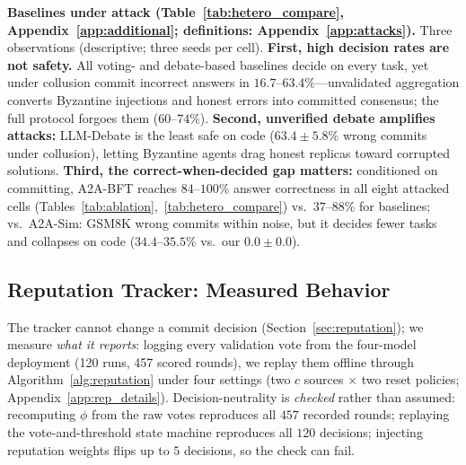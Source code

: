 \documentclass{article}
\begin{document}
\textbf{Baselines under attack (Table~\ref{tab:hetero_compare}, Appendix~\ref{app:additional}; definitions: Appendix~\ref{app:attacks}).} Three observations (descriptive; three seeds per cell). \textbf{First, high decision rates are not safety.} All voting- and debate-based baselines decide on every task, yet under collusion commit incorrect answers in $16.7$--$63.4\%$---unvalidated aggregation converts Byzantine injections and honest errors into committed consensus; the full protocol forgoes them ($60$--$74\%$). \textbf{Second, unverified debate amplifies attacks:} LLM-Debate \citep{du2024improving} is the least safe on code ($63.4 \pm 5.8\%$ wrong commits under collusion), letting Byzantine agents drag honest replicas toward corrupted solutions. \textbf{Third, the correct-when-decided gap matters:} conditioned on committing, A2A-BFT reaches $84$--$100\%$ answer correctness in all eight attacked cells (Tables~\ref{tab:ablation},~\ref{tab:hetero_compare}) vs.\ $37$--$88\%$ for baselines; vs.\ A2A-Sim: GSM8K wrong commits within noise, but it decides fewer tasks and collapses on code ($34.4$--$35.5\%$ vs.\ our $0.0{\pm}0.0$).

\subsection{Reputation Tracker: Measured Behavior}\label{sec:rep_ablation}

The tracker cannot change a commit decision (Section~\ref{sec:reputation}); we measure \emph{what it reports}: logging every validation vote from the four-model deployment (120 runs, 457 scored rounds), we replay them offline through Algorithm~\ref{alg:reputation} under four settings (two $c$ sources $\times$ two reset policies; Appendix~\ref{app:rep_details}). Decision-neutrality is \emph{checked} rather than assumed: recomputing $\phi$ from the raw votes reproduces all $457$ recorded rounds; replaying the vote-and-threshold state machine reproduces all $120$ decisions; injecting reputation weights flips up to $5$ decisions, so the check can fail.
\end{document}
